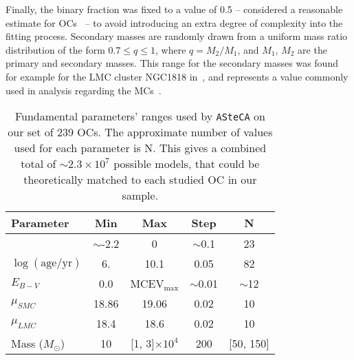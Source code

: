 \documentclass{aa}
\begin{document}
Finally, the binary fraction was fixed to a value of 0.5 -- considered a
reasonable estimate for OCs~\citep{von_Hippel_2005,Sollima_2010} -- to avoid
introducing an extra degree of complexity into the fitting process. Secondary
masses are randomly drawn from a uniform mass ratio distribution of the form
$0.7{\le}q{\le}1$, where $q{=}M_2/M_1$, and $M_1$, $M_2$ are the primary and
secondary masses. This range for the secondary masses was found for example for
the LMC cluster NGC1818 in~\cite{Elson_1998}, and represents a value commonly
used in analysis regarding the
MCs~\citep[see][and references therein]{Rubele_2011}.

\begin{table}
\centering
\caption{Fundamental parameters' ranges used by \texttt{ASteCA} on our set
of 239 OCs. The approximate number of values used for each parameter is N.
This gives a combined total of ${\sim}2.3 {\times}10^7$ possible models, that
could be theoretically matched to each studied OC in our sample.}
\label{tab:ga-range}
\begin{tabular}{lcccc}
\hline\hline
 Parameter & Min & Max & Step & N\\
\hline
[Fe/H] & $\sim$-2.2 & 0 & $\sim$0.1 & 23\\
$\log\mathrm{(age/yr)}$ & 6. & 10.1 & 0.05 & 82\\
$E_{B-V}$ & 0.0 & MCEV$_{\max}$ & ${\sim}$0.01 & $\sim$12\\
$\mu_{SMC}$ & 18.86 & 19.06 & 0.02 & 10\\
$\mu_{LMC}$ & 18.4 & 18.6 & 0.02 & 10\\
Mass ($M_{\odot}$) & 10 & [1, 3]${\times}10^{4}$ & 200 & [50, 150]\\
\hline
\end{tabular}
\end{table}


\end{document}

